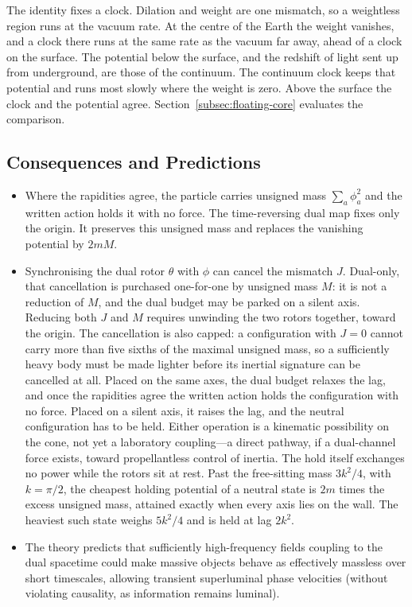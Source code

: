 \documentclass[a4paper]{article}
\begin{document}
The identity fixes a clock. Dilation and weight are one mismatch, so a weightless region runs at the vacuum rate. At the centre of the Earth the weight vanishes, and a clock there runs at the same rate as the vacuum far away, ahead of a clock on the surface. The potential below the surface, and the redshift of light sent up from underground, are those of the continuum. The continuum clock keeps that potential and runs most slowly where the weight is zero. Above the surface the clock and the potential agree. Section~\ref{subsec:floating-core} evaluates the comparison.

\subsection{Consequences and Predictions}

\begin{itemize}
\item Where the rapidities agree, the particle carries unsigned mass \(\sum_a\phi_a^2\) and the written action holds it with no force. The time-reversing dual map fixes only the origin. It preserves this unsigned mass and replaces the vanishing potential by \(2mM\).
\item Synchronising the dual rotor $\theta$ with $\phi$ can cancel the mismatch $J$. Dual-only, that cancellation is purchased one-for-one by unsigned mass $M$: it is not a reduction of $M$, and the dual budget may be parked on a silent axis. Reducing both $J$ and $M$ requires unwinding the two rotors together, toward the origin. The cancellation is also capped: a configuration with $J=0$ cannot carry more than five sixths of the maximal unsigned mass, so a sufficiently heavy body must be made lighter before its inertial signature can be cancelled at all. Placed on the same axes, the dual budget relaxes the lag, and once the rapidities agree the written action holds the configuration with no force. Placed on a silent axis, it raises the lag, and the neutral configuration has to be held. Either operation is a kinematic possibility on the cone, not yet a laboratory coupling---a direct pathway, if a dual-channel force exists, toward propellantless control of inertia. The hold itself exchanges no power while the rotors sit at rest. Past the free-sitting mass \(3k^2/4\), with \(k=\pi/2\), the cheapest holding potential of a neutral state is \(2m\) times the excess unsigned mass, attained exactly when every axis lies on the wall. The heaviest such state weighs \(5k^2/4\) and is held at lag \(2k^2\).
\item The theory predicts that sufficiently high-frequency fields coupling to the dual spacetime could make massive objects behave as effectively massless over short timescales, allowing transient superluminal phase velocities (without violating causality, as information remains luminal).
\end{itemize}
\end{document}
